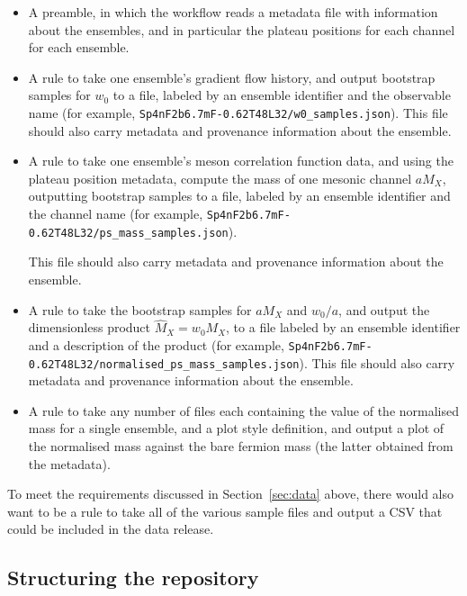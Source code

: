 \documentclass{article}
\begin{document}
\begin{itemize}
  \item
        A preamble,
        in which the workflow reads a metadata file with information about the ensembles,
        and in particular the plateau positions for each channel for each ensemble.
  \item
        A rule to take one ensemble's gradient flow history,
        and output bootstrap samples for $w_{0}$ to a file,
        labeled by an ensemble identifier and the observable name
        (for example,
        \texttt{Sp4nF2b6.7mF-0.62T48L32/\hspace{0pt}w0\_samples.json}).
        This file should also carry metadata and provenance information about the ensemble.
  \item
        A rule to take one ensemble's meson correlation function data,
        and using the plateau position metadata,
        compute the mass of one mesonic channel $aM_{X}$,
        outputting bootstrap samples to a file,
        labeled by an ensemble identifier and the channel name
        (for example,
        \texttt{Sp4nF2b6.7mF-0.62T48L32/\hspace{0pt}ps\_mass\_samples.json}).

        This file should also carry metadata and provenance information about the ensemble.
  \item
        A rule to take the bootstrap samples for $aM_{X}$ and $w_{0}/a$,
        and output the dimensionless product $\hat{M}_{X}=w_{0}M_{X}$,
        to a file labeled by an ensemble identifier and a description of the product
        (for example,
        \texttt{Sp4nF2b6.7mF-0.62T48L32/\hspace{0pt}normalised\_ps\_mass\_samples.json}).
        This file should also carry metadata and provenance information about the ensemble.
  \item
        A rule to take any number of files
        each containing the value of the normalised mass for a single ensemble,
        and a plot style definition,
        and output a plot of the normalised mass against the bare fermion mass
        (the latter obtained from the metadata).
\end{itemize}

To meet the requirements discussed in Section~\ref{sec:data} above,
there would also want to be a rule to take all of the various sample files
and output a CSV that could be included in the data release.

\subsection{Structuring the repository}
\end{document}
